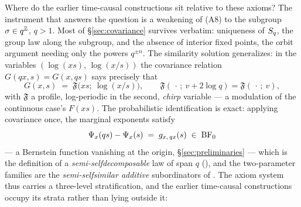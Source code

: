 \begin{remark}\label{rem:strata}
Where do the earlier time-causal constructions sit relative to these axioms? The instrument
that answers the question is a weakening of (A8) to the subgroup $\sigma \in q^{\mathbb{Z}}$,
$q > 1$. Most of \S\ref{sec:covariance} survives verbatim: uniqueness of $S_q$, the
group law along the subgroup, and the absence of interior fixed points, the orbit argument
needing only the powers $q^{\pm n}$. The similarity solution generalizes: in the variables
$(\log(xs),\, \log(x/s))$ the covariance relation $G(qx, s) = G(x, qs)$ says precisely that
\[
  G(x, s) \;=\; \mathfrak{F}\bigl(x s;\ \log(x/s)\bigr),
  \qquad \mathfrak{F}(\,\cdot\,;\ v + 2\log q) = \mathfrak{F}(\,\cdot\,;\ v),
\]
with $\mathfrak{F}$ a profile, log-periodic in the second, \emph{chirp} variable --- a
modulation of the continuous case's $F(xs)$. The probabilistic identification is exact:
applying covariance once, the marginal exponents satisfy
\[
  \Psi_x(qs) - \Psi_x(s) \;=\; g_{x,\,qx}(s) \;\in\; \mathrm{BF}_0
\]
--- a Bernstein function vanishing at the origin, \S\ref{sec:preliminaries} --- which is the
definition of a \emph{semi-selfdecomposable} law of span $q$
(), and the two-parameter families are the \emph{semi-selfsimilar
additive} subordinators of . The axiom system thus carries a
three-level stratification, and the earlier time-causal constructions occupy its strata
rather than lying outside it:


\end{remark}
